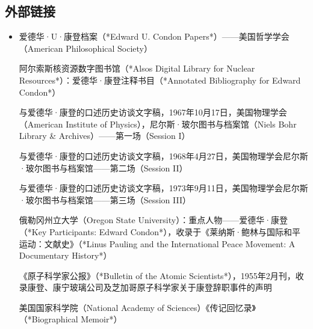 \subsection{外部链接}
\begin{itemize}
\item 爱德华·U·康登档案（*Edward U. Condon Papers*）——美国哲学学会（American Philosophical Society）

阿尔索斯核资源数字图书馆（*Alsos Digital Library for Nuclear Resources*）：爱德华·康登注释书目（*Annotated Bibliography for Edward Condon*）

与爱德华·康登的口述历史访谈文字稿，1967年10月17日，美国物理学会（American Institute of Physics），尼尔斯·玻尔图书与档案馆（Niels Bohr Library & Archives）——第一场（Session I）

与爱德华·康登的口述历史访谈文字稿，1968年4月27日，美国物理学会尼尔斯·玻尔图书与档案馆——第二场（Session II）

与爱德华·康登的口述历史访谈文字稿，1973年9月11日，美国物理学会尼尔斯·玻尔图书与档案馆——第三场（Session III）

俄勒冈州立大学（Oregon State University）：重点人物——爱德华·康登（*Key Participants: Edward Condon*），收录于《莱纳斯·鲍林与国际和平运动：文献史》（*Linus Pauling and the International Peace Movement: A Documentary History*）

《原子科学家公报》（*Bulletin of the Atomic Scientists*），1955年2月刊，收录康登、康宁玻璃公司及芝加哥原子科学家关于康登辞职事件的声明

美国国家科学院（National Academy of Sciences）《传记回忆录》（*Biographical Memoir*）

\end{itemize}